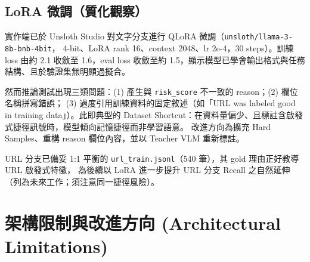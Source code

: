 \documentclass[11pt]{ctexart}
\begin{document}
\subsection{LoRA 微調（質化觀察）}
實作端已於 Unsloth Studio 對文字分支進行 QLoRA 微調（\texttt{unsloth/llama-3-8b-bnb-4bit}，
4-bit、LoRA rank 16、context 2048、lr 2e-4，30 steps）。訓練 loss 由約 2.1 收斂至 1.6，eval loss
收斂至約 1.5，顯示模型已學會輸出格式與任務結構、且於驗證集無明顯過擬合。

然而推論測試出現三類問題：(1) 產生與 \texttt{risk\_score} 不一致的 reason；(2) 欄位名稱拼寫錯誤；
(3) 過度引用訓練資料的固定敘述（如「URL was labeled good in training data」）。此即典型的
Dataset Shortcut：在資料量偏少、且標註含啟發式捷徑訊號時，模型傾向記憶捷徑而非學習語意。
改進方向為擴充 Hard Samples、重構 reason 欄位內容，並以 Teacher VLM 重新標註。

URL 分支已備妥 1:1 平衡的 \texttt{url\_train.jsonl}（540 筆），其 gold 理由正好教導 URL 啟發式特徵，
為後續以 LoRA 進一步提升 URL 分支 Recall 之自然延伸（列為未來工作；須注意同一捷徑風險）。

\section{架構限制與改進方向 (Architectural Limitations)}
\end{document}
